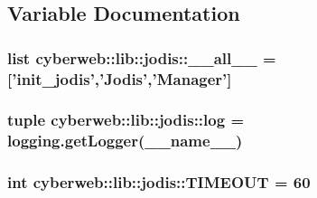 \subsection{\-Variable \-Documentation}
\hypertarget{namespacecyberweb_1_1lib_1_1jodis_aeaa783d21eacd62ebe525540b17b3146}{
\subsubsection[{\-\_\-\-\_\-all\-\_\-\-\_\-}]{\setlength{\rightskip}{0pt plus 5cm}list {\bf cyberweb\-::lib\-::jodis\-::\-\_\-\-\_\-all\-\_\-\-\_\-} = \mbox{[}'{\bf init\-\_\-jodis}','\-Jodis','\-Manager'\mbox{]}}}\label{namespacecyberweb_1_1lib_1_1jodis_aeaa783d21eacd62ebe525540b17b3146}
\hypertarget{namespacecyberweb_1_1lib_1_1jodis_aef28175cdd4cacff25a0116945c4026a}{
\subsubsection[{log}]{\setlength{\rightskip}{0pt plus 5cm}tuple {\bf cyberweb\-::lib\-::jodis\-::log} = logging.\-get\-Logger(\-\_\-\-\_\-name\-\_\-\-\_\-)}}\label{namespacecyberweb_1_1lib_1_1jodis_aef28175cdd4cacff25a0116945c4026a}
\hypertarget{namespacecyberweb_1_1lib_1_1jodis_a973a4a9b053ac2d06a201807191a553b}{
\subsubsection[{\-T\-I\-M\-E\-O\-U\-T}]{\setlength{\rightskip}{0pt plus 5cm}int {\bf cyberweb\-::lib\-::jodis\-::\-T\-I\-M\-E\-O\-U\-T} = 60}}\label{namespacecyberweb_1_1lib_1_1jodis_a973a4a9b053ac2d06a201807191a553b}
